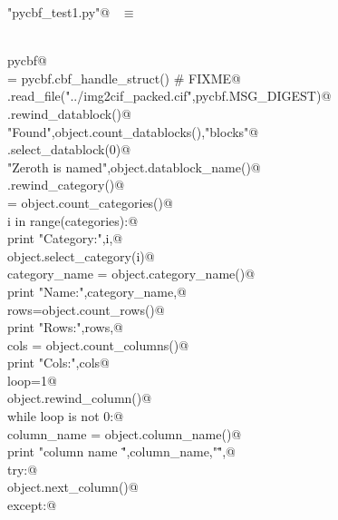 \documentclass[10pt,a4paper,twoside,notitlepage]{article}
\begin{document}
\begin{flushleft} \small \label{scrap17}
\verb@"pycbf_test1.py"@\nobreak\ {\footnotesize {} }$\equiv$
\vspace{-1ex}
\begin{list}{}{} \item
\mbox{}\verb@@\\
\mbox{}\verb@import pycbf@\\
\mbox{}\verb@object = pycbf.cbf_handle_struct() # FIXME@\\
\mbox{}\verb@object.read_file("../img2cif_packed.cif",pycbf.MSG_DIGEST)@\\
\mbox{}\verb@object.rewind_datablock()@\\
\mbox{}\verb@print "Found",object.count_datablocks(),"blocks"@\\
\mbox{}\verb@object.select_datablock(0)@\\
\mbox{}\verb@print "Zeroth is named",object.datablock_name()@\\
\mbox{}\verb@object.rewind_category()@\\
\mbox{}\verb@categories = object.count_categories()@\\
\mbox{}\verb@for i in range(categories):@\\
\mbox{}\verb@    print "Category:",i,@\\
\mbox{}\verb@    object.select_category(i)@\\
\mbox{}\verb@    category_name = object.category_name()@\\
\mbox{}\verb@    print "Name:",category_name,@\\
\mbox{}\verb@    rows=object.count_rows()@\\
\mbox{}\verb@    print "Rows:",rows,@\\
\mbox{}\verb@    cols = object.count_columns()@\\
\mbox{}\verb@    print "Cols:",cols@\\
\mbox{}\verb@    loop=1@\\
\mbox{}\verb@    object.rewind_column()@\\
\mbox{}\verb@    while loop is not 0:@\\
\mbox{}\verb@        column_name = object.column_name()@\\
\mbox{}\verb@        print "column name \"",column_name,"\"",@\\
\mbox{}\verb@        try:@\\
\mbox{}\verb@           object.next_column()@\\
\mbox{}\verb@        except:@\\

\end{list}
\end{flushleft}
\end{document}
